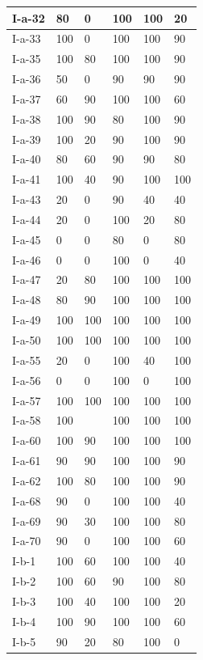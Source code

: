 \documentclass[11pt,a4paper]{article}
\begin{document}
\begin{table}[h]
\begin{tabular}{|l|l|l|l|l|l|}
I-a-32 & 80 & 0 & 100 & 100 & 20 \\ \hline
I-a-33 & 100 & 0 & 100 & 100 & 90 \\ \hline
I-a-35 & 100 & 80 & 100 & 100 & 90 \\ \hline
I-a-36 & 50 & 0 & 90 & 90 & 90 \\ \hline
I-a-37 & 60 & 90 & 100 & 100 & 60 \\ \hline
I-a-38 & 100 & 90 & 80 & 100 & 90 \\ \hline
I-a-39 & 100 & 20 & 90 & 100 & 90 \\ \hline
I-a-40 & 80 & 60 & 90 & 90 & 80 \\ \hline
I-a-41 & 100 & 40 & 90 & 100 & 100 \\ \hline
I-a-43 & 20 & 0 & 90 & 40 & 40 \\ \hline
I-a-44 & 20 & 0 & 100 & 20 & 80 \\ \hline
I-a-45 & 0 & 0 & 80 & 0 & 80 \\ \hline
I-a-46 & 0 & 0 & 100 & 0 & 40 \\ \hline
I-a-47 & 20 & 80 & 100 & 100 & 100 \\ \hline
I-a-48 & 80 & 90 & 100 & 100 & 100 \\ \hline
I-a-49 & 100 & 100 & 100 & 100 & 100 \\ \hline
I-a-50 & 100 & 100 & 100 & 100 & 100 \\ \hline
I-a-55 & 20 & 0 & 100 & 40 & 100 \\ \hline
I-a-56 & 0 & 0 & 100 & 0 & 100 \\ \hline
I-a-57 & 100 & 100 & 100 & 100 & 100 \\ \hline
I-a-58 & 100 &  & 100 & 100 & 100 \\ \hline
I-a-60 & 100 & 90 & 100 & 100 & 100 \\ \hline
I-a-61 & 90 & 90 & 100 & 100 & 90 \\ \hline
I-a-62 & 100 & 80 & 100 & 100 & 90 \\ \hline
I-a-68 & 90 & 0 & 100 & 100 & 40 \\ \hline
I-a-69 & 90 & 30 & 100 & 100 & 80 \\ \hline
I-a-70 & 90 & 0 & 100 & 100 & 60 \\ \hline
I-b-1 & 100 & 60 & 100 & 100 & 40 \\ \hline
I-b-2 & 100 & 60 & 90 & 100 & 80 \\ \hline
I-b-3 & 100 & 40 & 100 & 100 & 20 \\ \hline
I-b-4 & 100 & 90 & 100 & 100 & 60 \\ \hline
I-b-5 & 90 & 20 & 80 & 100 & 0 \\ \hline

\end{tabular}
\end{table}
\end{document}
